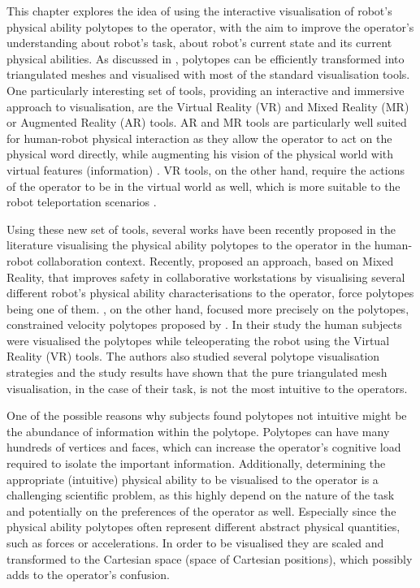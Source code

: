 This chapter explores the idea of using the interactive visualisation of robot's physical ability polytopes to the operator, with the aim to improve the operator's understanding about robot's task, about robot's current state and its current physical abilities.
As discussed in , polytopes can be efficiently transformed into triangulated meshes and visualised with most of the standard visualisation tools. One particularly interesting set of tools, providing an interactive and immersive approach to visualisation, are the Virtual Reality (VR) and Mixed Reality (MR) or Augmented Reality (AR) tools. AR and MR tools are particularly well suited for human-robot physical interaction as they allow the operator to act on the physical word directly, while augmenting his vision of the physical world with virtual features (information) \cite{Suzuki2022ARSurvey}. VR tools, on the other hand, require the actions of the operator to be in the virtual world as well, which is more suitable to the robot teleportation scenarios \cite{Merwe2019VRTeleop}. 

Using these new set of tools, several works have been recently proposed in the literature visualising the physical ability polytopes to the operator in the human-robot collaboration context. Recently, \citet{Weistroffer2022Using} proposed an approach, based on Mixed Reality, that improves safety in collaborative workstations by visualising several different robot's physical ability characterisations to the operator, force polytopes being one of them. \citet{Zolotas2021}, on the other hand, focused more precisely on the polytopes, constrained velocity polytopes proposed by \citet{long_constrained_2020}. In their study the human subjects were visualised the polytopes while teleoperating the robot using the Virtual Reality (VR) tools. The authors also studied several polytope visualisation strategies and the study results have shown that the pure triangulated mesh visualisation, in the case of their task, is not the most intuitive to the operators.

One of the possible reasons why subjects found polytopes not intuitive might be the abundance of information within the polytope. Polytopes can have many hundreds of vertices and faces, which can increase the operator's cognitive load required to isolate the important information. 
Additionally, determining the appropriate (intuitive) physical ability to be visualised to the operator is a challenging scientific problem, as this highly depend on the nature of the task and potentially on the preferences of the operator as well. Especially since the physical ability polytopes often represent different abstract physical quantities, such as forces or accelerations. In order to be visualised they are scaled and transformed to the Cartesian space (space of Cartesian positions), which possibly adds to the operator's confusion. 

